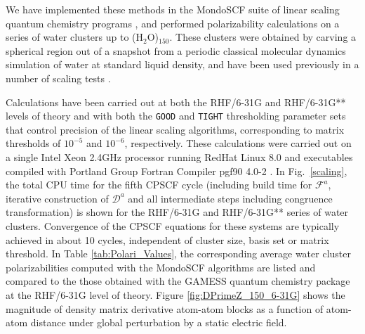 \documentclass[prl,aps,preprint,showpacs,superbib]{revtex4}
\begin{document}
We have implemented these methods in the {\sc MondoSCF} suite of linear scaling quantum chemistry programs \cite{MondoSCF},
and performed polarizability calculations on a series of water clusters up to (H$_2$O)$_{150}$.  These clusters were
obtained by carving a spherical region out of a snapshot from a periodic classical  molecular dynamics simulation of water 
at standard liquid density, and have been used previously in a number of scaling tests 
\cite{ANiklasson03,MChallacombe97,ESchwegler97}.

Calculations have been carried out at both the RHF/6-31G and RHF/6-31G** levels of 
theory and with both the {\tt GOOD} and {\tt TIGHT} thresholding parameter sets that control precision of the 
linear scaling algorithms, corresponding to matrix thresholds of $10^{-5}$ and $10^{-6}$, respectively.  
These calculations were carried out on a single Intel Xeon 2.4GHz processor running RedHat Linux 8.0 and  executables compiled 
with Portland Group Fortran Compiler pgf90 4.0-2 \cite{PGF90}. In Fig.~\ref{scaling}, the 
total CPU time for the fifth CPSCF cycle (including build time for $\mathcal{F}^a$, 
iterative construction of $\mathcal{D}^a$ and all intermediate 
steps including congruence transformation) is shown for the RHF/6-31G and RHF/6-31G** series 
of water clusters.  Convergence of the CPSCF equations for these systems are typically 
achieved in about 10 cycles, independent of cluster size, basis set or matrix threshold.  
In Table \ref{tab:Polari_Values},  the corresponding average water cluster polarizabilities computed with the  {\sc MondoSCF}
algorithms are listed and compared to the those obtained with the {\sc GAMESS} quantum chemistry package \cite{gamess} 
at the RHF/6-31G level of theory.  Figure \ref{fig:DPrimeZ_150_6-31G} shows the magnitude of density matrix 
derivative atom-atom blocks as a function of atom-atom distance under global perturbation by a static electric field.
\end{document}
